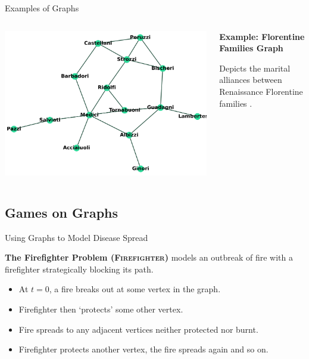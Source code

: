 \documentclass[unknownkeysallowed]{beamer}
\begin{document}
\begin{frame}{Examples of Graphs}

\begin{columns}

\begin{column}{.6\textwidth}
\includegraphics[width=.8\linewidth,valign=t]{assets/florentine}
\end{column}

\begin{column}{.4\textwidth}
\textbf{Example: Florentine Families Graph}
\vspace{5pt}

Depicts the marital alliances between Renaissance Florentine families \cite{padgett_1993}.

\end{column}

\end{columns}

\end{frame}

\subsection{Games on Graphs}

\begin{frame}{Using Graphs to Model Disease Spread}

\textbf{The Firefighter Problem ({\scshape Firefighter})} \cite{hartnell_1995} models an outbreak of fire with a firefighter strategically blocking its path.

\begin{itemize}
	\pause
	\item At $t=0$, a fire breaks out at some vertex in the graph.
	\pause
	\item Firefighter then `protects' some other vertex.
	\pause
	\item Fire spreads to any adjacent vertices neither protected nor burnt. 
	\pause
	\item Firefighter protects another vertex, the fire spreads again and so on.
\end{itemize}

\end{frame}
\end{document}
